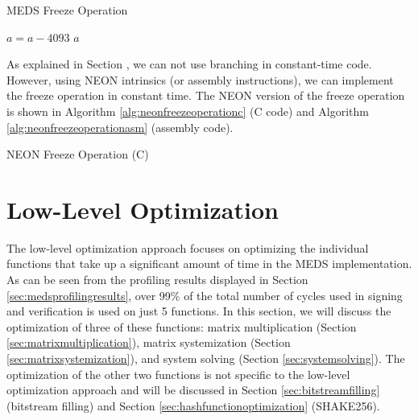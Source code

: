 \documentclass[11pt,a4paper]{report}
\theoremstyle{definition}
\begin{document}
\begin{algorithm}
  \caption{MEDS Freeze Operation}
  \label{alg:freezeoperation}
  \begin{algorithmic}
        \State $a = a - 4093$
      \EndIf
      \State \Return $a$
    \EndFunction
  \end{algorithmic}
\end{algorithm}

As explained in Section , we can not use branching in constant-time code. However, using NEON intrinsics (or assembly instructions), we can implement the freeze operation in constant time. The NEON version of the freeze operation is shown in Algorithm \ref{alg:neonfreezeoperationc} (C code) and Algorithm \ref{alg:neonfreezeoperationasm} (assembly code).

\begin{algorithm}
  \caption{NEON Freeze Operation (C)}
  \label{alg:neonfreezeoperationc}
  
\end{algorithm}

\begin{algorithm}
  \caption{NEON Freeze Operation (Assembly)}
  \label{alg:neonfreezeoperationasm}
  Assembler}, style=ASMStyle]{code/freeze_asm.s}
\end{algorithm}

\section{Low-Level Optimization}
\label{sec:lowleveloptimization}
The low-level optimization approach focuses on optimizing the individual functions that take up a significant amount of time in the MEDS implementation. As can be seen from the profiling results displayed in Section \ref{sec:medsprofilingresults}, over 99\% of the total number of cycles used in signing and verification is used on just 5 functions. In this section, we will discuss the optimization of three of these functions: matrix multiplication (Section \ref{sec:matrixmultiplication}), matrix systemization (Section \ref{sec:matrixsystemization}), and system solving (Section \ref{sec:systemsolving}). The optimization of the other two functions is not specific to the low-level optimization approach and will be discussed in Section \ref{sec:bitstreamfilling} (bitstream filling) and Section \ref{sec:hashfunctionoptimization} (SHAKE256).
\end{document}
